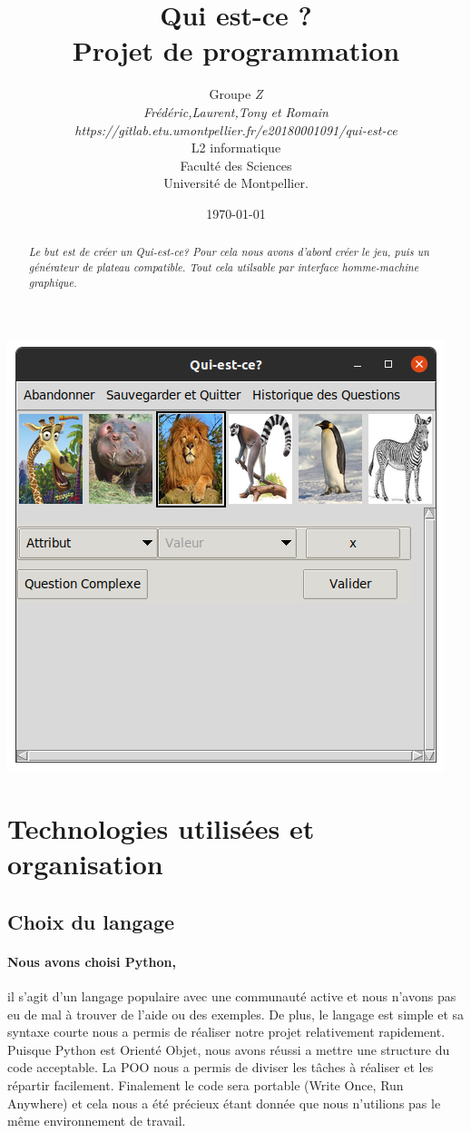 \documentclass[a4paper]{article}
\title{  Qui est-ce ?\\         %
Projet de programmation}
\author{Groupe \emph{Z}\\
  \emph{Frédéric,Laurent,Tony et Romain}\\
  \emph{https://gitlab.etu.umontpellier.fr/e20180001091/qui-est-ce}\\
  L2 informatique\\
  Faculté des Sciences\\
Université de Montpellier.}
\date{\today}
\begin{document}
\maketitle
\begin{center}
    \includegraphics[scale=0.7]{./fenetreJeu.png}
\end{center}
\clearpage

\newpage
\tableofcontents
\clearpage


\begin{abstract}     %
  \emph{Le but est de créer un Qui-est-ce? Pour cela nous avons d'abord créer le jeu, puis un générateur de plateau compatible. Tout cela utilsable par interface homme-machine graphique.}
\end{abstract}

\section{Technologies utilisées  et organisation}
\subsection{Choix du langage}
\paragraph*{Nous avons choisi Python,} il s'agit d'un langage populaire avec une communauté active et nous n'avons pas eu de mal à trouver de l'aide ou des exemples.
De plus, le langage est simple et sa syntaxe courte nous a permis de réaliser notre projet relativement rapidement.
Puisque Python est Orienté Objet, nous avons réussi a mettre une structure du code acceptable.
La POO nous a permis de diviser les tâches à réaliser et les répartir facilement.
Finalement le code sera portable (Write Once, Run Anywhere) et cela nous a été précieux étant donnée que nous n'utilions pas le même environnement de travail.
\end{document}

